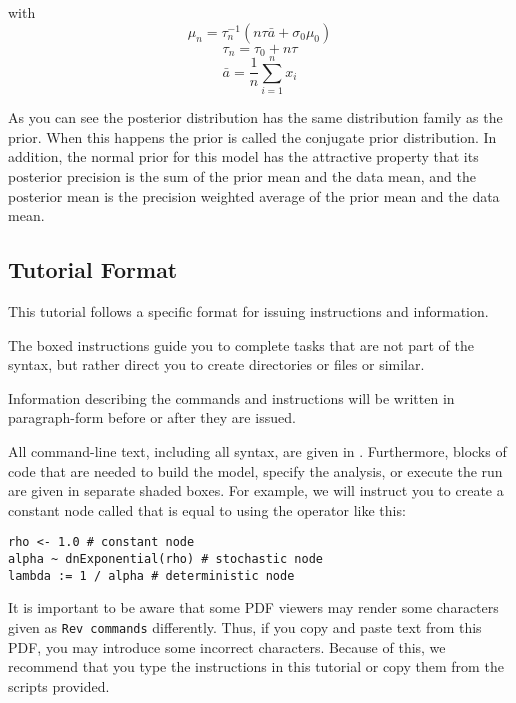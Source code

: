 with
\[ \mu_n = \tau_n^{-1} (n\tau \bar{a} + \sigma_0 \mu_0) \]
   \[\tau_n = \tau_0 + n\tau \]
   \[\bar{a} = \frac{1}{n}\sum_{i=1}^{n} x_i\]

As you can see the posterior distribution has the same distribution family as the prior. When this happens the prior is called the conjugate prior distribution. In addition, the normal prior for this model has the attractive property that its posterior precision is the sum of the prior mean and the data mean, and the posterior mean is the precision weighted average of the prior mean and the data mean.


\medskip
\subsection{Tutorial Format}\label{subsect:Exercise-Format}

This tutorial follows a specific format for issuing instructions and information.

{\begin{framed}
The boxed instructions guide you to complete tasks that are not part of the \RevBayes syntax, but rather direct you to create directories or files or similar.
\end{framed}}

Information describing the commands and instructions will be written in paragraph-form before or after they are issued.

All command-line text, including all \Rev syntax, are given in . 
Furthermore, blocks of \Rev code that are needed to build the model, specify the analysis, or execute the run are given in separate shaded boxes.
For example, we will instruct you to create a constant node called  that is equal to  using the \cl{<-} operator like this:
{\tt \begin{snugshade*}
\begin{lstlisting}
rho <- 1.0 # constant node
alpha ~ dnExponential(rho) # stochastic node
lambda := 1 / alpha # deterministic node
\end{lstlisting}
\end{snugshade*}}

It is important to be aware that some PDF viewers may render some characters given as \colorbox{shadecolor}{\tt{Rev commands}} differently. 
Thus, if you copy and paste text from this PDF, you may introduce some incorrect characters. 
Because of this, we recommend that you type the instructions in this tutorial or copy them from the scripts provided. 


